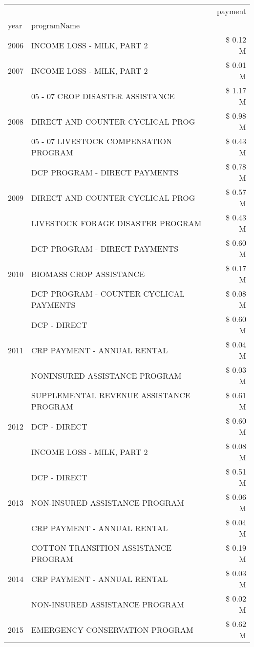 \begin{tabular}{llr}
\toprule
 &  & payment \\
year & programName &  \\
\midrule
2006 & INCOME LOSS - MILK, PART 2 & \$ 0.12 M \\
\cline{1-3}
2007 & INCOME LOSS - MILK, PART 2 & \$ 0.01 M \\
\cline{1-3}
\multirow[t]{3}{*}{2008} & 05 - 07 CROP DISASTER ASSISTANCE & \$ 1.17 M \\
 & DIRECT AND COUNTER CYCLICAL PROG & \$ 0.98 M \\
 & 05 - 07 LIVESTOCK COMPENSATION PROGRAM & \$ 0.43 M \\
\cline{1-3}
\multirow[t]{3}{*}{2009} & DCP PROGRAM - DIRECT PAYMENTS & \$ 0.78 M \\
 & DIRECT AND COUNTER CYCLICAL PROG & \$ 0.57 M \\
 & LIVESTOCK FORAGE DISASTER  PROGRAM & \$ 0.43 M \\
\cline{1-3}
\multirow[t]{3}{*}{2010} & DCP PROGRAM - DIRECT PAYMENTS & \$ 0.60 M \\
 & BIOMASS CROP ASSISTANCE & \$ 0.17 M \\
 & DCP PROGRAM - COUNTER CYCLICAL PAYMENTS & \$ 0.08 M \\
\cline{1-3}
\multirow[t]{3}{*}{2011} & DCP - DIRECT & \$ 0.60 M \\
 & CRP PAYMENT - ANNUAL RENTAL & \$ 0.04 M \\
 & NONINSURED ASSISTANCE PROGRAM & \$ 0.03 M \\
\cline{1-3}
\multirow[t]{3}{*}{2012} & SUPPLEMENTAL REVENUE ASSISTANCE PROGRAM & \$ 0.61 M \\
 & DCP - DIRECT & \$ 0.60 M \\
 & INCOME LOSS - MILK, PART 2 & \$ 0.08 M \\
\cline{1-3}
\multirow[t]{3}{*}{2013} & DCP - DIRECT & \$ 0.51 M \\
 & NON-INSURED ASSISTANCE PROGRAM & \$ 0.06 M \\
 & CRP PAYMENT - ANNUAL RENTAL & \$ 0.04 M \\
\cline{1-3}
\multirow[t]{3}{*}{2014} & COTTON TRANSITION ASSISTANCE PROGRAM & \$ 0.19 M \\
 & CRP PAYMENT - ANNUAL RENTAL & \$ 0.03 M \\
 & NON-INSURED ASSISTANCE PROGRAM & \$ 0.02 M \\
\cline{1-3}
\multirow[t]{3}{*}{2015} & EMERGENCY CONSERVATION PROGRAM & \$ 0.62 M \\

\end{tabular}
